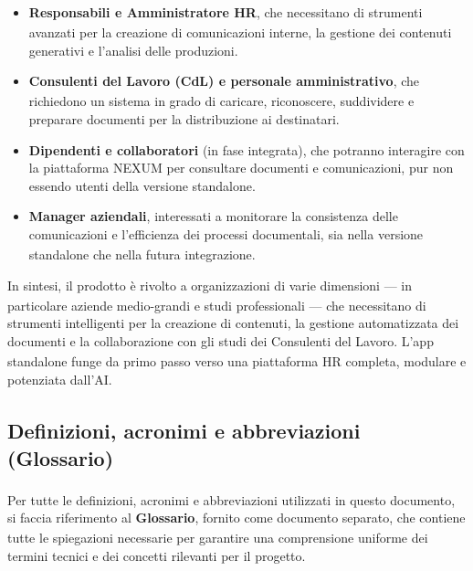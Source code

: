 ﻿\documentclass[a4paper,11pt]{article}
\begin{document}
\begin{itemize}
    \item \textbf{Responsabili e Amministratore\textsubscript{} HR}, che necessitano di strumenti avanzati per la creazione di comunicazioni interne, 
    la gestione dei contenuti generativi e l'analisi delle produzioni.

    \item \textbf{Consulenti del Lavoro (CdL)\textsubscript{} e personale amministrativo}, che richiedono un sistema in grado di caricare, riconoscere, suddividere e preparare documenti per la distribuzione ai destinatari.

    \item \textbf{Dipendenti e collaboratori} (in fase integrata), che potranno interagire con la piattaforma NEXUM per consultare documenti e comunicazioni, 
    pur non essendo utenti della versione standalone.

    \item \textbf{Manager aziendali}, interessati a monitorare la consistenza delle comunicazioni e l'efficienza\textsubscript{} dei processi documentali, 
    sia nella versione standalone che nella futura integrazione.
\end{itemize}

In sintesi, il prodotto\textsubscript{} è rivolto a organizzazioni di varie dimensioni — in particolare aziende medio-grandi e studi professionali — 
che necessitano di strumenti intelligenti per la creazione di contenuti, 
la gestione automatizzata dei documenti e la collaborazione con gli studi dei Consulenti del Lavoro\textsubscript{}.
L'app standalone funge da primo passo verso una piattaforma HR completa, modulare e potenziata dall'AI\textsubscript{}.


\subsection{Definizioni, acronimi e abbreviazioni (Glossario\textsubscript{})}
Per tutte le definizioni, acronimi e abbreviazioni utilizzati in questo documento, si faccia
riferimento al \textbf{Glossario\textsubscript{}}, fornito come documento separato, che contiene tutte le spiegazioni
necessarie per garantire una comprensione uniforme dei termini tecnici e dei concetti
rilevanti per il progetto\textsubscript{}.
\end{document}
